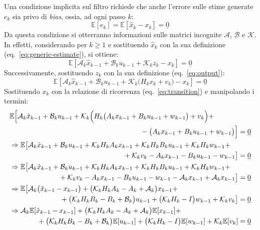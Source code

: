 \documentclass[12pt,a4paper,openright,twoside]{book}
\begin{document}
Una condizione implicita sul filtro richiede che anche l'errore sulle stime generate $e_k$ sia privo di \textit{bias}, ossia, ad ogni passo $k$:
$$\mathbb{E}[e_k]=\mathbb{E}[\hat{x}_k-x_k]=\underline{0}$$
Da questa condizione si otterranno informazioni sulle matrici incognite $\mathcal{A}$, $\mathcal{B}$ e $\mathcal{K}$. In effetti, considerando per $k\geq 1$ e sostituendo $\hat{x}_k$ con la sua definizione (eq.~\ref{eq:generic-estimate}), si ottiene:
$$\mathbb{E}[\mathcal{A}_k\hat{x}_{k-1}+\mathcal{B}_ku_{k-1}+\mathcal{K}_kz_k-x_k]=\underline{0}$$
Successivamente, sostituendo $z_k$ con la sua definizione (eq.~\ref{eq:output}):
$$\mathbb{E}\left[\mathcal{A}_k\hat{x}_{k-1}+\mathcal{B}_ku_{k-1}+\mathcal{K}_k\bigl(H_kx_k+v_k\bigr)-x_k\right]=\underline{0}$$
Sostituendo $x_k$ con la relazione di ricorrenza (eq.~\ref{eq:transition}) e manipolando i termini:
\begin{gather*}
\begin{multlined}[\textwidth]
\mathbb{E}\Bigl[\mathcal{A}_k\hat{x}_{k-1}+\mathcal{B}_ku_{k-1}+\mathcal{K}_k\Bigl(H_k\bigl(A_kx_{k-1}+B_ku_{k-1}+w_{k-1}\bigr)+v_k\Bigr)+ \\
-\bigl(A_kx_{k-1}+B_ku_{k-1}+w_{k-1}\bigr)\Bigr]=\underline{0}
\end{multlined} \\
\begin{multlined}[\textwidth]
\Rightarrow\mathbb{E}\bigl[\mathcal{A}_k\hat{x}_{k-1}+\mathcal{B}_ku_{k-1}+\mathcal{K}_kH_kA_kx_{k-1}+\mathcal{K}_kH_kB_ku_{k-1}+\mathcal{K}_kH_kw_{k-1}+ \\
+\mathcal{K}_kv_k-A_kx_{k-1}-B_ku_{k-1}-w_{k-1}\bigr]=\underline{0}
\end{multlined} \\
\begin{multlined}[\textwidth]
\Rightarrow\mathbb{E}\bigl[\mathcal{A}_k\hat{x}_{k-1}+\mathcal{B}_ku_{k-1}+\mathcal{K}_kH_kA_kx_{k-1}+\mathcal{K}_kH_kB_ku_{k-1}+\mathcal{K}_kH_kw_{k-1}+ \\
+\mathcal{K}_kv_k-A_kx_{k-1}-B_ku_{k-1}-w_{k-1}-\mathcal{A}_kx_{k-1}+\mathcal{A}_kx_{k-1}\bigr]=\underline{0}
\end{multlined} \\
\begin{multlined}[\textwidth]
\Rightarrow\mathbb{E}\bigl[\mathcal{A}_k\bigl(\hat{x}_{k-1}-x_{k-1}\bigr)+\bigl(\mathcal{K}_kH_kA_k-A_k+\mathcal{A}_k\bigr)x_{k-1}+ \\
+\bigl(\mathcal{K}_kH_kB_k-B_k+\mathcal{B}_k\bigr)u_{k-1}+\bigl(\mathcal{K}_kH_k-I\bigr)w_{k-1}+\mathcal{K}_kv_k\bigr]=\underline{0}
\end{multlined} \\
\begin{multlined}[\textwidth]
\Rightarrow\mathcal{A}_k\mathbb{E}[\hat{x}_{k-1}-x_{k-1}]+\bigl(\mathcal{K}_kH_kA_k-A_k+\mathcal{A}_k\bigr)\mathbb{E}[x_{k-1}]+ \\
+\bigl(\mathcal{K}_kH_kB_k-B_k+\mathcal{B}_k\bigr)\mathbb{E}[u_{k-1}]+\bigl(\mathcal{K}_kH_k-I\bigr)\mathbb{E}[w_{k-1}]+\mathcal{K}_k\mathbb{E}[v_k]=\underline{0}
\end{multlined}
\end{gather*}
\end{document}
